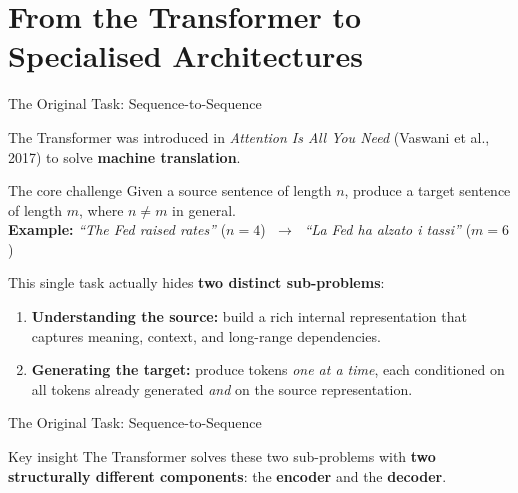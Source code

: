 \documentclass[aspectratio=169]{beamer}
\begin{document}
\section{From the Transformer to Specialised Architectures}
%
\begin{frame}{The Original Task: Sequence-to-Sequence}

The Transformer was introduced in \emph{Attention Is All You Need}
(Vaswani et al., 2017) to solve \textbf{machine translation}.

\medskip
\begin{block}{The core challenge}
  Given a source sentence of length $n$, produce a target sentence
  of length $m$, where $n \neq m$ in general.\\[4pt]
  \textbf{Example:} \quad
  \textit{``The Fed raised rates''} \;($n{=}4$)
  $\;\longrightarrow\;$
  \textit{``La Fed ha alzato i tassi''} \;($m{=}6$)
\end{block}

\medskip
This single task actually hides \textbf{two distinct sub-problems}:

\begin{enumerate}
  \item \textbf{Understanding the source:} build a rich internal
        representation that captures meaning, context, and
        long-range dependencies.
  \item \textbf{Generating the target:} produce tokens
        \emph{one at a time}, each conditioned on all tokens
        already generated \emph{and} on the source representation.
\end{enumerate}
\end{frame}
%
%
\begin{frame}{The Original Task: Sequence-to-Sequence}
\begin{alertblock}{Key insight}
  The Transformer solves these two sub-problems with \textbf{two
  structurally different components}: the \textbf{encoder} and the
  \textbf{decoder}.
\end{alertblock}

\end{frame}
%
%
\end{document}
